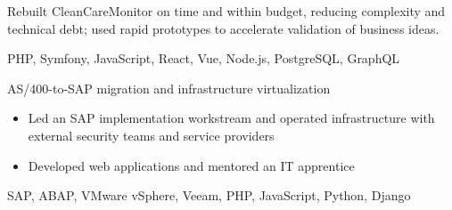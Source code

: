 \documentclass[10pt,a4paper]{altacv}
\begin{document}
Rebuilt CleanCareMonitor on time and within budget, reducing complexity and technical debt; used rapid prototypes to accelerate validation of business ideas.

\par\smallskip
{}
PHP, Symfony, JavaScript, React, Vue, Node.js, PostgreSQL, GraphQL

\divider

 AS/400-to-SAP migration and infrastructure virtualization
\begin{itemize}
\item Led an SAP implementation workstream and operated infrastructure with external security teams and service providers
\item Developed web applications and mentored an IT apprentice

\end{itemize}

SAP, ABAP, VMware vSphere, Veeam, PHP, JavaScript, Python, Django
\end{document}
